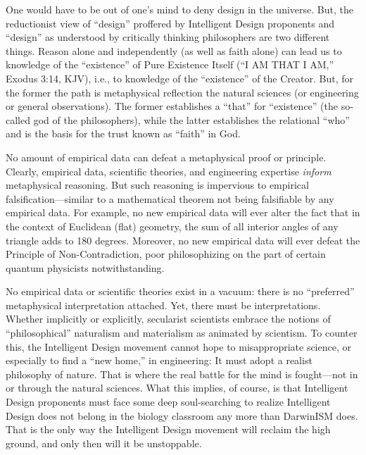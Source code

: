 One would have to be out of one's mind to deny design in the universe. But, the reductionist view of ``design'' proffered by Intelligent Design proponents and ``design'' as understood by critically thinking philosophers are two different things. 
Reason alone and independently (as well as faith alone) can lead us to knowledge of the ``existence'' of Pure Existence Itself (``I AM THAT I AM,'' Exodus 3:14, KJV), i.e., to knowledge of the ``existence'' of the Creator. But, for the former the path is  metaphysical reflection  the natural sciences (or engineering or general observations). The former establishes a ``that'' for ``existence'' (the so-called god of the philosophers), while the latter establishes the relational ``who'' and is the basis for the trust known as ``faith'' in  God.

No amount of empirical data can defeat a metaphysical proof or principle. Clearly, empirical data, scientific theories, and engineering expertise \textit{inform} metaphysical reasoning. But such reasoning is impervious to empirical falsification—similar to a mathematical theorem not being falsifiable by any empirical data. For example, no new empirical data will ever alter the fact that in the context of Euclidean (flat) geometry, the sum of all interior angles of any triangle adds to 180 degrees. Moreover, no new empirical data will ever defeat the Principle of Non-Contradiction, poor philosophizing on the part of certain quantum physicists notwithstanding.


No empirical data or scientific theories exist in a vacuum: there is no ``preferred'' metaphysical interpretation attached. Yet, there must be interpretations. Whether implicitly or explicitly, secularist scientists embrace the notions of ``philosophical'' naturalism and materialism as animated by scientism. To counter this, the Intelligent Design movement cannot hope to misappropriate science, or especially to find a ``new home,'' in engineering: It must adopt a realist philosophy of nature. That is where the real battle for the mind is fought---not in or through the natural sciences. What this implies, of course, is that Intelligent Design proponents must face some deep soul-searching to realize Intelligent Design does not belong in the biology classroom any more than DarwinISM does. That is the only way the Intelligent Design movement will reclaim the high ground, and only then will it be unstoppable.

